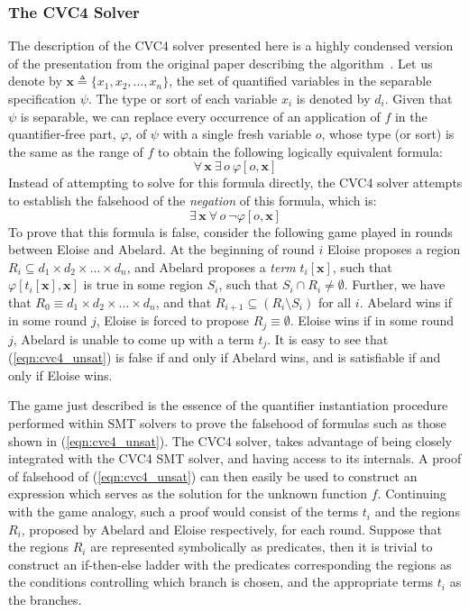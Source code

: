 \subsubsection{The CVC4  Solver}
The description of the CVC4 \sygusbody solver presented here is a highly
condensed version of the presentation from the original paper
describing the algorithm~\cite{reynolds-15}.  Let us denote by
$\mathbf{x} \triangleq \{x_1, x_2, \ldots, x_n\}$, the set of
quantified variables in the separable \sygusbody specification $\psi$. The
type or sort of each variable $x_i$ is denoted by $d_i$.
Given that $\psi$ is separable, we can replace every occurrence of
an application of $f$ in the quantifier-free part, $\varphi$, of
$\psi$ with a single fresh variable $o$, whose
type (or sort) is the same as the range of $f$ to
obtain the following logically equivalent formula:
\begin{equation*}
\forall\,\mathbf{x}\ \exists\, o\ \varphi[o, \mathbf{x}]
\end{equation*}
Instead of attempting to solve for this formula directly, the CVC4
\sygusbody solver attempts to establish the falsehood of the
\emph{negation} of this formula, which is:
\begin{equation}
\exists\,\mathbf{x}\ \forall\,o\ \neg\varphi[o, \mathbf{x}]
\label{eqn:cvc4_unsat}
\end{equation}
To prove that this formula is false, consider the following
game played in rounds between Eloise and Abelard. At the beginning of
round $i$ Eloise proposes a region $R_i \subseteq d_1 \times d_2
\times \ldots \times d_n$, and Abelard proposes a \emph{term}
$t_i[\mathbf{x}]$, such that $\varphi[t_i[\mathbf{x}], \mathbf{x}]$
is true in some region $S_i$, such that $S_i \cap R_i \neq \emptyset$.
Further, we have that $R_0 \equiv d_1 \times d_2
\times \ldots \times d_n$, and that $R_{i+1} \subseteq (R_{i}
\setminus S_i)$ for all $i$. Abelard wins if in some round $j$, Eloise
is forced to propose $R_j \equiv \emptyset$. Eloise wins if in some
round $j$, Abelard is unable to come up with a term $t_j$. It is easy
to see that (\ref{eqn:cvc4_unsat}) is false if and only if
Abelard wins, and is satisfiable if and only if Eloise wins.

The game just described is the essence of the quantifier instantiation
procedure performed within SMT solvers to prove the falsehood
of formulas such as those shown in (\ref{eqn:cvc4_unsat}). The CVC4
\sygusbody solver, takes advantage of being closely integrated with the
CVC4 SMT solver, and having access to its internals. A proof of
falsehood of (\ref{eqn:cvc4_unsat}) can then easily be used to
construct an expression which serves as the solution for the unknown
function $f$. Continuing with the game analogy, such a proof would
consist of the terms $t_i$ and the regions $R_i$, proposed by Abelard
and Eloise respectively, for each round. Suppose that the regions
$R_i$ are represented symbolically as predicates, then it is trivial
to construct an if-then-else ladder with the predicates corresponding
the regions as the conditions controlling which branch is chosen, and
the appropriate terms $t_i$ as the branches.

